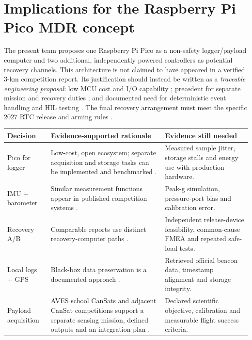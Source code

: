 \documentclass[10pt,a4paper]{article}
\begin{document}
\section{Implications for the Raspberry Pi Pico MDR concept}
The present team proposes one Raspberry Pi Pico as a non-safety logger/payload computer and two additional, independently powered controllers as potential recovery channels. This architecture is not claimed to have appeared in a verified 3-km competition report. Its justification should instead be written as a \emph{traceable engineering proposal}: low MCU cost and I/O capability \cite{rpicopico}; precedent for separate mission and recovery duties \cite{astg2022aves2}; and documented need for deterministic event handling and HIL testing \cite{netzel2026}. The final recovery arrangement must meet the specific 2027 RTC release and arming rules \cite{rtc2027rules}.

\begin{tabularx}{\linewidth}{@{}L{32mm}Y L{45mm}@{}}
\toprule{}\textbf{Decision} & \textbf{Evidence-supported rationale} & \textbf{Evidence still needed}\\\midrule
Pico for logger & Low-cost, open ecosystem; separate acquisition and storage tasks can be implemented and benchmarked \cite{rpicopico}. & Measured sample jitter, storage stalls and energy use with production hardware.\\
IMU + barometer & Similar measurement functions appear in published competition systems \cite{astg2021aves,astg2022aves2}. & Peak-g simulation, pressure-port bias and calibration error.\\
Recovery A/B & Comparable reports use distinct recovery-computer paths \cite{astg2022aves2}. & Independent release-device feasibility, common-cause FMEA and repeated safe-load tests.\\
Local logs + GPS & Black-box data preservation is a documented approach \cite{astg2021aves,netzel2026}. & Retrieved official beacon data, timestamp alignment and storage integrity.\\
Payload acquisition & AVES school CanSats and adjacent CanSat competitions support a separate sensing mission, defined outputs and an integration plan \cite{astg2021aves,ukcansat2024,pwraerospace2023}. & Declared scientific objective, calibration and measurable flight success criteria.\\
\bottomrule
\end{tabularx}
\end{document}
